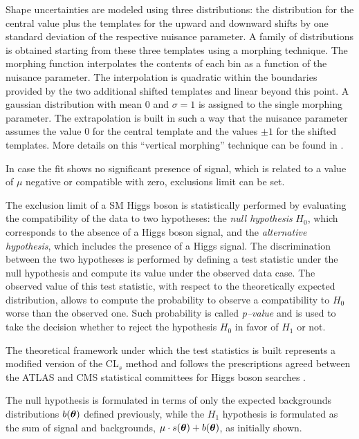 Shape uncertainties are modeled using three distributions: the distribution for the central value plus the templates for the upward and downward shifts by one standard deviation of the respective nuisance parameter. A family of distributions is obtained starting from these three templates using a morphing technique. The morphing function interpolates the contents of each bin as a function of the nuisance parameter. The interpolation is quadratic within the boundaries provided by the two additional shifted templates and linear beyond this point. A gaussian distribution with mean 0 and $\sigma = 1$ is assigned to the single morphing parameter. The extrapolation is built in such a way that the nuisance parameter assumes the value 0 for the central template and the values $\pm1$ for the shifted templates. More details on this ``vertical morphing'' technique can be found in \cite{Conway:2011in}.

{\color{red}
In case the fit shows no significant presence of signal, which is related to a value of $\mu$ negative or compatible with zero, exclusions limit can be set.
}


The exclusion limit of a SM Higgs boson is statistically performed by evaluating the compatibility of the data to two hypotheses: the \emph{null hypothesis} $H_0$, which corresponds to the absence of a Higgs boson signal, and the  \emph{alternative hypothesis}, which includes the presence of a Higgs signal. The discrimination between the two hypotheses is performed by defining a test statistic under the null hypothesis and compute its value under the observed data case. The observed value of this test statistic, with respect to the theoretically expected distribution, allows to compute the probability to observe a compatibility to $H_0$ worse than the observed one. Such probability is called \emph{p--value} and is used to take the decision whether to reject the hypothesis $H_0$ in favor of $H_1$ or not.

The theoretical framework under which the test statistics is built represents a modified version of the CL$_s$ method \cite{CLs} and follows the prescriptions agreed between the ATLAS and CMS statistical committees for Higgs boson searches \cite{higgscombo}.

{\color{red}
The null hypothesis is formulated in terms of only the expected backgrounds distributions $b(\boldsymbol\theta)$ defined previously, while 
the $H_1$ hypothesis is formulated as the sum of signal and backgrounds, $\mu \cdot s(\boldsymbol\theta) + b(\boldsymbol\theta)$, as initially shown.
}

